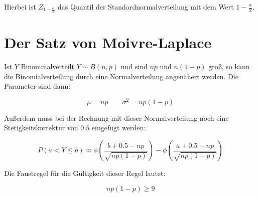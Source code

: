Hierbei ist $Z_{1-\frac{\alpha}{2}}$ das Quantil der Standardnormalverteilung mit dem Wert $1-\frac{\alpha}{2}$.

\section{Der Satz von Moivre-Laplace}

Ist $Y$ Binominalverteilt $Y \sim B(n,p)$ und sind $np$ und $n(1-p)$ groß, so kann die Binomialverteilung durch eine Normalverteilung angenähert werden.
Die Parameter sind dann:

\[\mu = np \qquad \sigma^2=np(1-p)\]

Außerdem muss bei der Rechnung mit dieser Normalverteilung noch eine Stetigkeitskorrektur von $0.5$ eingefügt werden:

\[P(a < Y \le b) \approx 
  \phi\left(\frac{b+\mathbf{0.5}-np}{\sqrt{np(1-p)}}\right) - 
  \phi\left(\frac{a+\mathbf{0.5}-np}{\sqrt{np(1-p)}}\right)\]

Die Faustregel für die Gültigkeit dieser Regel lautet:

\[np(1-p) \ge 9\]

